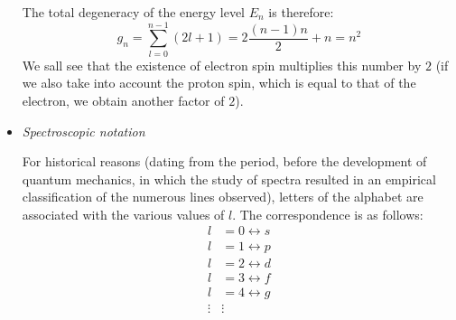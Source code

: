 \begin{itemize}
The total degeneracy of the energy level $E_n$ is therefore:
\begin{equation}\label{C-49}
	g_n=\sum_{l=0}^{n-1}(2l+1)=2\frac{(n-1)n}{2}+n=n^2
\end{equation}
We sall see that the existence of electron spin multiplies this number by $2$ (if we also take into account the proton spin, which is equal to that of the electron, we obtain another factor of $2$).

\item \textit{Spectroscopic notation}

For historical reasons (dating from the period, before the development of quantum mechanics, in which the study of spectra resulted in an empirical classification of the numerous lines observed), letters of the alphabet are associated with the various values of $l$. The correspondence is as follows:
\begin{align*}
	l&=0\leftrightarrow s\\
	l&=1\leftrightarrow p\\
	l&=2\leftrightarrow d\\
	l&=3\leftrightarrow f\\
	l&=4\leftrightarrow g\\
	\vdots & \vdots
\end{align*}

\end{itemize}





































